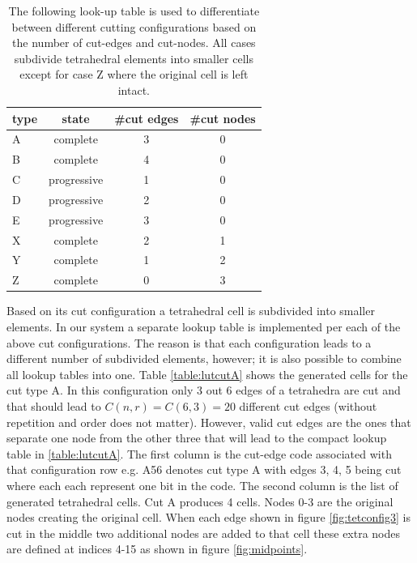 \begin{table}[H]
\begin{center}
\caption{\label{table:allcutconfigs}{The following look-up table is used to differentiate between different cutting configurations based on
the number of cut-edges and cut-nodes. All cases subdivide tetrahedral elements into smaller cells except for case Z where the original
cell is left intact.}}
  \begin{tabular}{ | l | c | c | c | }
    \hline    
    type & state & \#cut edges & \#cut nodes \\ \hline \hline    
    A & complete & 3 & 0 \\ \hline
    B & complete & 4 & 0 \\ \hline
    C & progressive & 1 & 0 \\ \hline
    D & progressive & 2 & 0 \\ \hline
    E & progressive & 3 & 0 \\ \hline
    X & complete & 2 & 1 \\ \hline
    Y & complete & 1 & 2 \\ \hline
    Z & complete & 0 & 3 \\ \hline
    \hline
  \end{tabular}
\end{center}
\end{table}

Based on its cut configuration a tetrahedral cell is subdivided into smaller elements. In our system a separate lookup table is 
implemented per each of the above cut configurations. The reason is that each configuration leads to a different number of subdivided elements, however;
it is also possible to combine all lookup tables into one. Table \ref{table:lutcutA} shows the generated cells for the cut type A.
In this configuration only 3 out 6 edges of a tetrahedra are cut and that should lead to $C(n, r) = C(6, 3) = 20$ different cut edges (without repetition and
order does not matter). However, valid cut edges are the ones that separate one node from the other three that will lead to the compact lookup table in \ref{table:lutcutA}.
The first column is the cut-edge code associated with that configuration row e.g. A56 denotes cut type A with edges 3, 4, 5 being cut where each each represent one bit in 
the code. The second column is the list of generated tetrahedral cells. Cut A produces 4 cells. Nodes 0-3 are the original nodes creating the original cell. When each edge 
shown in figure \ref{fig:tetconfig3} is cut in the middle two additional nodes are added to that cell these extra nodes are defined at indices 4-15 as shown in figure 
\ref{fig:midpoints}.

